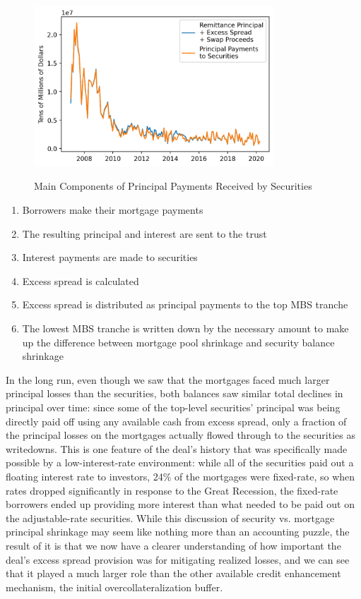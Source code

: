 \documentclass[12pt]{article}
\begin{document}
\begin{figure}[h]
	\centering
	\caption{Main Components of Principal Payments Received by Securities}
	\includegraphics[width=0.8\textwidth]{../figures/timeseries_security_principal_pmts_composition}
	\label{fig:timeseries_security_principal_pmts_composition}
\end{figure}

\begin{enumerate}
	\item Borrowers make their mortgage payments
	\item The resulting principal and interest are sent to the trust
	\item Interest payments are made to securities
	\item Excess spread is calculated
	\item Excess spread is distributed as principal payments to the top MBS tranche
	\item The lowest MBS tranche is written down by the necessary amount to make up the difference between mortgage pool shrinkage and security balance shrinkage
\end{enumerate}

In the long run, even though we saw that the mortgages faced much larger principal losses than the securities, both balances saw similar total declines in principal over time: since some of the top-level securities’ principal was being directly paid off using any available cash from excess spread, only a fraction of the principal losses on the mortgages actually flowed through to the securities as writedowns. This is one feature of the deal’s history that was specifically made possible by a low-interest-rate environment: while all of the securities paid out a floating interest rate to investors, 24\% of the mortgages were fixed-rate, so when rates dropped significantly in response to the Great Recession, the fixed-rate borrowers ended up providing more interest than what needed to be paid out on the adjustable-rate securities. While this discussion of security vs. mortgage principal shrinkage may seem like nothing more than an accounting puzzle, the result of it is that we now have a clearer understanding of how important the deal’s excess spread provision was for mitigating realized losses, and we can see that it played a much larger role than the other available credit enhancement mechanism, the initial overcollateralization buffer.
\end{document}
